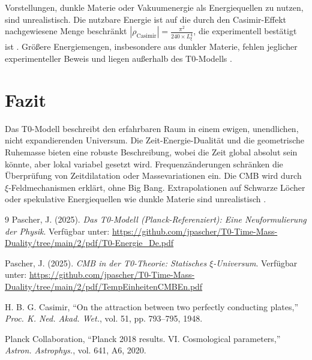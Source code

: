 \begin{critical}
	Vorstellungen, dunkle Materie oder Vakuumenergie als Energiequellen zu nutzen, sind unrealistisch. Die nutzbare Energie ist auf die durch den Casimir-Effekt nachgewiesene Menge beschränkt 
	\( |\rho_{\text{Casimir}}| = \frac{\pi^2}{240 \times L_\xi^4} \), die experimentell bestätigt ist \cite{Casimir1948}. 
	Größere Energiemengen, insbesondere aus dunkler Materie, fehlen jeglicher experimenteller Beweis und liegen außerhalb des T0-Modells \cite{pascher_t0_energie_2025}.
\end{critical}

\section{Fazit}
\label{sec:fazit}

Das T0-Modell beschreibt den erfahrbaren Raum in einem ewigen, unendlichen, nicht expandierenden Universum. Die Zeit-Energie-Dualität und die geometrische Ruhemasse bieten eine robuste Beschreibung, wobei die Zeit global absolut sein könnte, aber lokal variabel gesetzt wird. Frequenzänderungen schränken die Überprüfung von Zeitdilatation oder Massevariationen ein. Die CMB wird durch \(\xi\)-Feldmechanismen erklärt, ohne Big Bang. Extrapolationen auf Schwarze Löcher oder spekulative Energiequellen wie dunkle Materie sind unrealistisch \cite{pascher_t0_energie_2025}.

\begin{thebibliography}{9}
	Pascher, J. (2025). \textit{Das T0-Modell (Planck-Referenziert): Eine Neuformulierung der Physik}. 
	Verfügbar unter: \url{https://github.com/jpascher/T0-Time-Mass-Duality/tree/main/2/pdf/T0-Energie_De.pdf}
	
	Pascher, J. (2025). \textit{CMB in der T0-Theorie: Statisches \(\xi\)-Universum}. 
	Verfügbar unter: \url{https://github.com/jpascher/T0-Time-Mass-Duality/tree/main/2/pdf/TempEinheitenCMBEn.pdf}
	
	H. B. G. Casimir, ``On the attraction between two perfectly conducting plates,'' \emph{Proc. K. Ned. Akad. Wet.}, vol. 51, pp. 793--795, 1948.
	
	Planck Collaboration, ``Planck 2018 results. VI. Cosmological parameters,'' \emph{Astron. Astrophys.}, vol. 641, A6, 2020.
\end{thebibliography}
